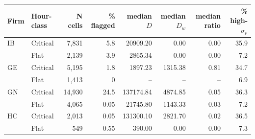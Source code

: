 \begin{tabular}{@{}l l r r r r r r@{}}
\toprule
Firm & Hour-class & N cells & \% flagged & median $D$ & median $D_w$ & median ratio & \% high-$\sigma_{p}$ \\
\midrule
IB & Critical & 7,831 & 5.8 & 20909.20 & 0.00 & 0.00 & 35.9 \\
 & Flat & 2,139 & 3.9 & 2865.34 & 0.00 & 0.00 & 7.2 \\
GE & Critical & 5,195 & 1.8 & 1897.23 & 1315.38 & 0.81 & 34.7 \\
 & Flat & 1,413 & 0 & -- & -- & -- & 6.9 \\
GN & Critical & 14,930 & 24.5 & 137174.84 & 4874.85 & 0.05 & 36.3 \\
 & Flat & 4,065 & 0.05 & 21745.80 & 1143.33 & 0.03 & 7.2 \\
HC & Critical & 2,013 & 0.05 & 131300.10 & 2821.70 & 0.02 & 36.5 \\
 & Flat & 549 & 0.55 & 390.00 & 0.00 & 0.00 & 7.3 \\
\bottomrule
\end{tabular}
